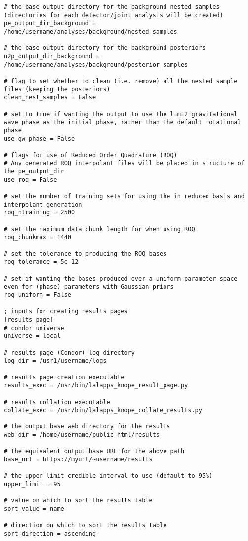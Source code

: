 \begin{lstlisting}[frame=single]
# the base output directory for the background nested samples (directories for each detector/joint analysis will be created)
pe_output_dir_background = /home/username/analyses/background/nested_samples

# the base output directory for the background posteriors
n2p_output_dir_background = /home/username/analyses/background/posterior_samples

# flag to set whether to clean (i.e. remove) all the nested sample files (keeping the posteriors)
clean_nest_samples = False

# set to true if wanting the output to use the l=m=2 gravitational wave phase as the initial phase, rather than the default rotational phase
use_gw_phase = False

# flags for use of Reduced Order Quadrature (ROQ)
# Any generated ROQ interpolant files will be placed in structure of the pe_output_dir
use_roq = False

# set the number of training sets for using the in reduced basis and interpolant generation
roq_ntraining = 2500

# set the maximum data chunk length for when using ROQ
roq_chunkmax = 1440

# set the tolerance to producing the ROQ bases
roq_tolerance = 5e-12

# set if wanting the bases produced over a uniform parameter space even for (phase) parameters with Gaussian priors
roq_uniform = False

; inputs for creating results pages
[results_page]
# condor universe
universe = local

# results page (Condor) log directory
log_dir = /usr1/username/logs

# results page creation executable
results_exec = /usr/bin/lalapps_knope_result_page.py

# results collation executable
collate_exec = /usr/bin/lalapps_knope_collate_results.py

# the output base web directory for the results
web_dir = /home/username/public_html/results

# the equivalent output base URL for the above path
base_url = https://myurl/~username/results

# the upper limit credible interval to use (default to 95%)
upper_limit = 95

# value on which to sort the results table
sort_value = name

# direction on which to sort the results table
sort_direction = ascending


\end{lstlisting}
